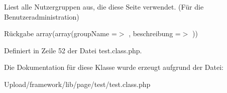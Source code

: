 Liest alle Nutzergruppen aus, die diese Seite verwendet. (Für die Benutzeradministration) \begin{DoxyReturn}{Rückgabe}
array(array(\textquotesingle{}group\+Name\textquotesingle{} =$>$ \textquotesingle{}\textquotesingle{}, \textquotesingle{}beschreibung\textquotesingle{} =$>$ \textquotesingle{}\textquotesingle{})) 
\end{DoxyReturn}


Definiert in Zeile 52 der Datei test.\+class.\+php.



Die Dokumentation für diese Klasse wurde erzeugt aufgrund der Datei\+:\begin{DoxyCompactItemize}
\item 
Upload/framework/lib/page/test/test.\+class.\+php\end{DoxyCompactItemize}
